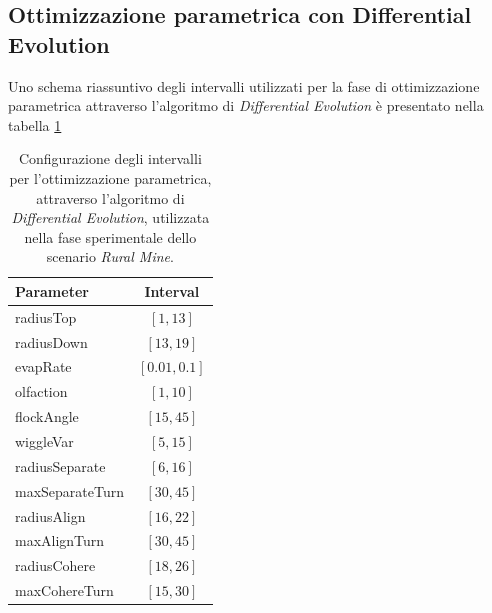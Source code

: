 \subsection{Ottimizzazione parametrica con Differential Evolution}

Uno schema riassuntivo degli intervalli utilizzati per la fase di ottimizzazione parametrica attraverso l'algoritmo di \textit{Differential Evolution} è presentato nella tabella \ref{tabella_intervalli_ruralMine}

\begin{table}[H]
    \centering
    
    \begin{tabular}{|l|c|}
    \hline
    \textbf{Parameter}              & \textbf{Interval}                 \\ \hline
    radiusTop                       & $[1,13]$                          \\ \hline
    radiusDown                      & $[13,19]$                         \\ \hline
    evapRate                        & $[0.01,0.1]$                      \\ \hline
    olfaction                       & $[1,10]$                          \\ \hline
    flockAngle                      & $[15,45]$                         \\ \hline
    wiggleVar                       & $[5,15]$                          \\ \hline
    radiusSeparate                  & $[6,16]$                          \\ \hline
    maxSeparateTurn                 & $[30,45]$                         \\ \hline
    radiusAlign                     & $[16,22]$                         \\ \hline
    maxAlignTurn                    & $[30,45]$                         \\ \hline
    radiusCohere                    & $[18,26]$                         \\ \hline
    maxCohereTurn                       & $[15,30]$                         \\ \hline
    \end{tabular}%
    
    \caption{Configurazione degli intervalli per l'ottimizzazione parametrica, attraverso l'algoritmo di \textit{Differential Evolution}, utilizzata nella fase sperimentale dello scenario \textit{Rural Mine}.}
    \label{tabella_intervalli_ruralMine}
\end{table}

